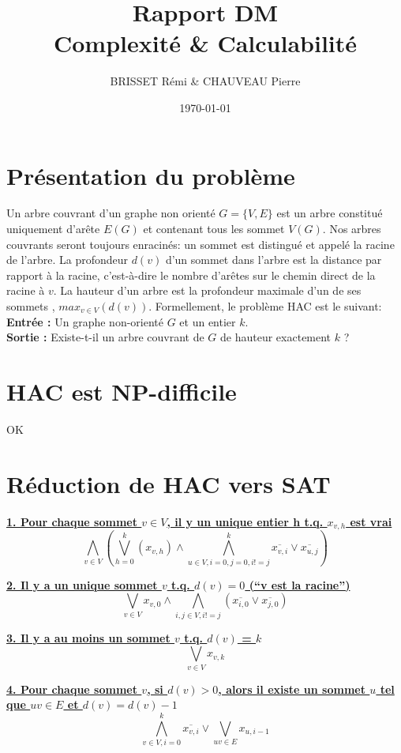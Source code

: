 \documentclass[12pt,a4paper]{article}
\title{Rapport DM \\
Complexité \& Calculabilité}
\author{BRISSET Rémi \& CHAUVEAU Pierre}
\date{\today}
\begin{document}
\maketitle
\tableofcontents
\newpage

\section{Présentation du problème}
Un arbre couvrant d'un graphe non orienté $G =\{V,E\}$ est un arbre constitué uniquement d'arête $E(G)$ et contenant tous les sommet $V(G)$. Nos  arbres couvrants seront toujours enracinés: un sommet est distingué et appelé la racine de l’arbre. La profondeur $d(v)$ d’un sommet dans l’arbre est la distance par rapport à la racine, c’est-à-dire le nombre d’arêtes sur le chemin direct de la racine à $v$. La hauteur d’un arbre est la profondeur maximale d’un de ses sommets , $max_{v\in V}(d(v))$. Formellement, le problème HAC est le suivant: \\
\indent \textbf{Entrée : } Un graphe non-orienté $G$ et un entier $k$. \\
\indent \textbf{Sortie : }Existe-t-il un arbre couvrant de $G$ de hauteur exactement $k$ ?\\

\section{HAC est NP-difficile}
OK

\newpage
\section{Réduction de HAC vers SAT}
\textbf{\underline{1. Pour chaque sommet $v \in V$, il y un unique entier h t.q. $x_{v,h}$ est vrai}}
\[
\bigwedge_{v \in V}( \bigvee_{h = 0}^{k} (x_{v,h}) \wedge \bigwedge_{u \in V, i=0, j=0, i!=j}^{k} \overline{x_{v,i}} \vee \overline{x_{u,j}})
\]

\textbf{\underline{2. Il y a un unique sommet $v$ t.q. $d(v) = 0$ (``v est la racine'')}}
\[
\bigvee_{v \in V} x_{v,0} \wedge \bigwedge_{i,j \in V, i!=j} (\overline{x_{i,0}} \vee \overline{x_{j,0}})
\]

\textbf{\underline{3. Il y a au moins un sommet $v$ t.q. $d(v)$ = $k$}}
\[
\bigvee_{v \in V}x_{v,k}
\]

\textbf{\underline{4. Pour chaque sommet $v$, si $d(v) > 0$, alors il existe un sommet $u$ tel que $uv \in E$ et $d(v) = d(v) - 1$}}
\[
\bigwedge_{v \in V, i=0}^{k} \overline{x_{v,i}} \vee \bigvee_{uv \in E} x_{u,i-1}
\]
\end{document}
